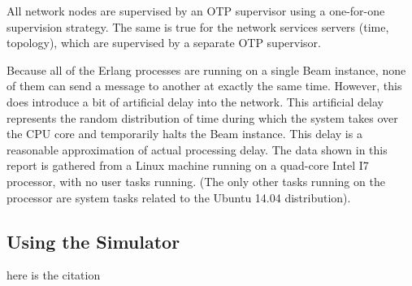 \documentclass[12pt]{article}
\begin{document}
All network nodes are supervised by an OTP supervisor using a one-for-one supervision strategy. The same is true for the network services servers (time, topology), which are supervised by a separate OTP supervisor.

Because all of the Erlang processes are running on a single Beam instance, none of them can send a message to another at exactly the same time. However, this does introduce a bit of artificial delay into the network. This artificial delay represents the random distribution of time during which the system takes over the CPU core and temporarily halts the Beam instance. This delay is a reasonable approximation of actual processing delay. The data shown in this report is gathered from a Linux machine running on a quad-core Intel I7 processor, with no user tasks running. (The only other tasks running on the processor are system tasks related to the Ubuntu 14.04 distribution).


\subsection{Using the Simulator}


\begin{thebibliography}{9} 

 here is the citation


\end{thebibliography} 
\end{document}
